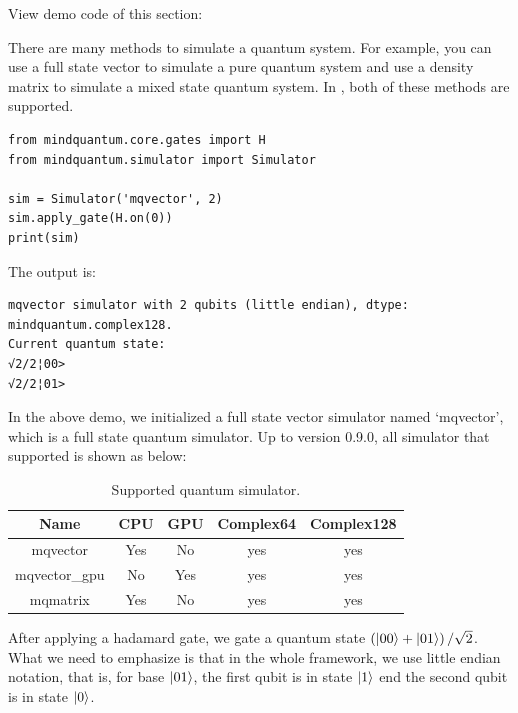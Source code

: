 
View demo code of this section: 

There are many methods to simulate a quantum system. For example, you can use a full state vector to simulate a pure quantum system and use a density matrix to simulate a mixed state quantum system. In \MindQuantum, both of these methods are supported.

\begin{lstlisting}
from mindquantum.core.gates import H
from mindquantum.simulator import Simulator

sim = Simulator('mqvector', 2)
sim.apply_gate(H.on(0))
print(sim)
\end{lstlisting}
The output is:

\begin{lstlisting}
mqvector simulator with 2 qubits (little endian), dtype: mindquantum.complex128.
Current quantum state:
√2/2¦00>
√2/2¦01>
\end{lstlisting}

In the above demo, we initialized a full state vector simulator named `mqvector', which is a full state quantum simulator. Up to version 0.9.0, all simulator that \MindQuantum supported is shown as below:
\begin{table}[ht]
    \begin{tabular}{ccccc}
        \toprule
        Name          & CPU & GPU & Complex64 & Complex128 \\
        \midrule
        mqvector      & Yes & No  & yes       & yes        \\
        mqvector\_gpu & No  & Yes & yes       & yes        \\
        mqmatrix      & Yes & No  & yes       & yes        \\
        \bottomrule
    \end{tabular}
    \caption{Supported quantum simulator.}
    \label{tab:simulator_supported}
\end{table}
After applying a hadamard gate, we gate a quantum state $\left(\ket{00}+\ket{01}\right)/\sqrt{2}$. What we need to emphasize is that in the whole framework, we use little endian notation, that is, for base $\ket{01}$, the first qubit is in state $\ket{1}$ end the second qubit is in state $\ket{0}$.

